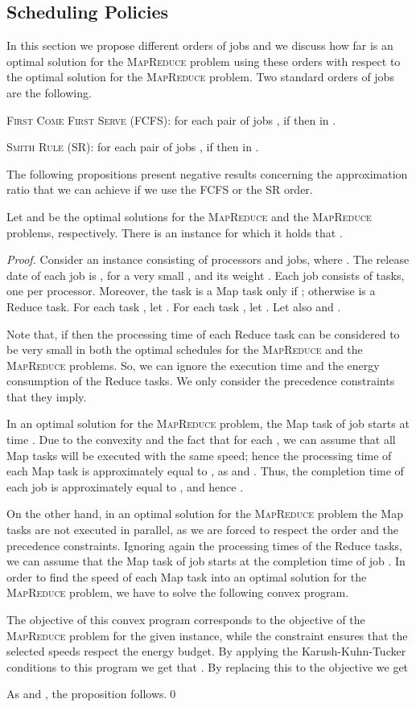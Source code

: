\documentclass{llncs}
\newcommand{\mr}{\textsc{MapReduce}\xspace}
\newcommand{\mrs}{\textsc{MapReduce}\xspace}
\newcommand{\fcfs}{\textsc{FCFS}\xspace}
\newcommand{\mrf}{\textsc{MapReduce}\xspace}
\newcommand{\sr}{\textsc{SR}\xspace}
\begin{document}
\subsection{Scheduling Policies}

In this section we propose different orders of jobs and we discuss how far is an optimal solution for the \mrs problem using these orders
with respect to the optimal solution for the \mr problem.
Two standard orders of jobs are the following.
\bigskip

\noindent\textsc{First Come First Serve} (\fcfs): for each pair of jobs , if  then  in .
\smallskip

\noindent\textsc{Smith Rule} (\sr): for each pair of jobs ,
if  then  in .
\bigskip


The following propositions present negative results concerning the approximation ratio that we can achieve if we use the \fcfs or the \sr order.

\begin{proposition}\label{prop:fcfs}
Let  and  be the optimal solutions for the \mr and the \mrf problems, respectively.
There is an instance for which it holds that .
\end{proposition}
\begin{proof}
Consider an instance consisting of  processors and  jobs, where .
The release date of each job  is , for a very small , and its weight .
Each job  consists of  tasks, one per processor.
Moreover, the task  is a Map task only if ; otherwise  is a Reduce task.
For each task , let .
For each task , let .
Let also  and .

Note that, if  then the processing time of each Reduce task can be considered to be very small
in both the optimal schedules for the \mr and the \mrf problems.
So, we can ignore the execution time and the energy consumption of the Reduce tasks.
We only consider the precedence constraints that they imply.

In an optimal solution for the \mr problem, the Map task of job  starts at time .
Due to the convexity and the fact that  for each ,
we can assume that all Map tasks will be executed with the same speed;
hence the processing time of each Map task is approximately equal to ,
as  and .
Thus, the completion time of each job is approximately equal to , and hence .

On the other hand, in an optimal solution for the \mrf problem the Map tasks are not executed in parallel,
as we are forced to respect the order and the precedence constraints.
Ignoring again the processing times of the Reduce tasks, we can assume that the Map task of job  starts at the completion time of job .
In order to find the speed  of each Map task 
into an optimal solution for the \mrf problem, we have to solve the following convex program.

The objective of this convex program corresponds to the objective of the \mrf problem for the given instance,
while the constraint ensures that the selected speeds respect the energy budget.
By applying the Karush-Kuhn-Tucker conditions to this program
we get that .
By replacing this to the objective we get


As  and , the proposition follows.\qed
\end{proof}
\end{document}
